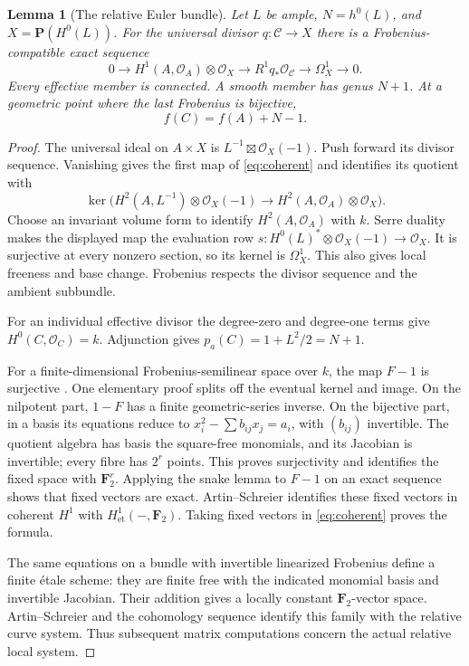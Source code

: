 \documentclass[11pt]{article}
\newtheorem{lemma}[theorem]{Lemma}
\theoremstyle{remark}\newtheorem{remark}[theorem]{Remark}
\newcommand{\OO}{\mathcal O}
\newcommand{\FF}{\mathbf F}
\newcommand{\PP}{\mathbf P}
\newcommand{\et}{\mathrm{et}}
\begin{document}
\begin{lemma}[The relative Euler bundle]\label{lem:euler-bundle}
Let $L$ be ample, $N=h^0(L)$, and $X=\PP(H^0(L))$. For the universal divisor $q:\mathcal C\to X$ there is a Frobenius-compatible exact sequence
\begin{equation}\label{eq:coherent}
 0\longrightarrow H^1(A,\OO_A)\otimes\OO_X
 \longrightarrow R^1q_*\OO_{\mathcal C}
 \longrightarrow\Omega_X^1\longrightarrow0.
\end{equation}
Every effective member is connected. A smooth member has genus $N+1$. At a geometric point where the last Frobenius is bijective,
\[
                         f(C)=f(A)+N-1.
\]
\end{lemma}
\begin{proof}
The universal ideal on $A\times X$ is $L^{-1}\boxtimes\OO_X(-1)$. Push forward its divisor sequence. Vanishing gives the first map of \eqref{eq:coherent} and identifies its quotient with
\[
 \ker\bigl(H^2(A,L^{-1})\otimes\OO_X(-1)
                   \longrightarrow H^2(A,\OO_A)\otimes\OO_X\bigr).
\]
Choose an invariant volume form to identify $H^2(A,\OO_A)$ with $k$. Serre duality makes the displayed map the evaluation row $s:H^0(L)^*\otimes\OO_X(-1)\to\OO_X$. It is surjective at every nonzero section, so its kernel is $\Omega_X^1$. This also gives local freeness and base change. Frobenius respects the divisor sequence and the ambient subbundle.

For an individual effective divisor the degree-zero and degree-one terms give $H^0(C,\OO_C)=k$. Adjunction gives $p_a(C)=1+L^2/2=N+1$.

For a finite-dimensional Frobenius-semilinear space over $k$, the map $F-1$ is surjective \citep[Lemma~59.63.2, full proof]{StacksAS}. One elementary proof splits off the eventual kernel and image. On the nilpotent part, $1-F$ has a finite geometric-series inverse. On the bijective part, in a basis its equations reduce to $x_i^2-\sum b_{ij}x_j=a_i$, with $(b_{ij})$ invertible. The quotient algebra has basis the square-free monomials, and its Jacobian is invertible; every fibre has $2^r$ points. This proves surjectivity and identifies the fixed space with $\FF_2^r$. Applying the snake lemma to $F-1$ on an exact sequence shows that fixed vectors are exact. Artin--Schreier identifies these fixed vectors in coherent $H^1$ with $H^1_{\et}(-,\FF_2)$. Taking fixed vectors in \eqref{eq:coherent} proves the formula.

The same equations on a bundle with invertible linearized Frobenius define a finite \'etale scheme: they are finite free with the indicated monomial basis and invertible Jacobian. Their addition gives a locally constant $\FF_2$-vector space. Artin--Schreier and the cohomology sequence identify this family with the relative curve system. Thus subsequent matrix computations concern the actual relative local system.
\end{proof}
\end{document}
